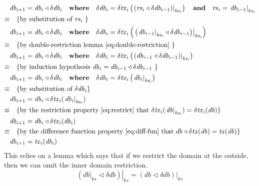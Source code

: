 \documentclass[11pt,a4paper]{article}
\newcommand\restrict[2]{\left.#1\right|_{#2}}
\begin{document}
\begin{align*}
       & \mathit{db}_{i+1} = \mathit{db}_i \triangleleft \delta\mathit{db}_i
         \quad \mathbf{where} \quad \delta\mathit{db}_i = \delta\mathit{tx}_i\left(\restrict{\left(\mathit{rs}_i \triangleleft \delta\mathit{db}_{i-1}\right)}{\mathit{ks}_i}\right)
         \quad \mathbf{and} \quad \mathit{rs}_i = \restrict{\mathit{db}_{i-1}}{\mathit{ks}_i}
      \\
\equiv & \quad \text{\{by substitution of $\mathit{rs}_i$ \}}
      \\
       & \mathit{db}_{i+1} = \mathit{db}_i \triangleleft \delta\mathit{db}_i
         \quad \mathbf{where} \quad \delta\mathit{db}_i = \delta\mathit{tx}_i\left(\restrict{\left(\restrict{\mathit{db}_{i-1}}{\mathit{ks}_i} \triangleleft \delta\mathit{db}_{i-1}\right)}{\mathit{ks}_i}\right)
      \\
\equiv & \quad \text{\{by double-restriction lemma \cref{eq:double-restriction} \}}
      \\
       & \mathit{db}_{i+1} = \mathit{db}_i \triangleleft \delta\mathit{db}_i
         \quad \mathbf{where} \quad \delta\mathit{db}_i = \delta\mathit{tx}_i\left(\restrict{\left(\mathit{db}_{i-1} \triangleleft \delta\mathit{db}_{i-1}\right)}{\mathit{ks}_i}\right)
      \\
\equiv & \quad \text{\{by induction hypothesis $\mathit{db}_i = \mathit{db}_{i-1} \triangleleft \delta\mathit{db}_{i-1}$ \}}
      \\
       & \mathit{db}_{i+1} = \mathit{db}_i \triangleleft \delta\mathit{db}_i
         \quad \mathbf{where} \quad \delta\mathit{db}_i = \delta\mathit{tx}_i\left(\restrict{\mathit{db}_i}{\mathit{ks}_i}\right)
      \\
\equiv & \quad \text{\{by substitution of $\delta\mathit{db}_i$\}}
      \\
       & \mathit{db}_{i+1} = \mathit{db}_i \triangleleft \delta\mathit{tx}_i(\restrict{\mathit{db}_i}{\mathit{ks}_i})
      \\
\equiv & \quad \text{\{by the restriction property \cref{eq:restrict} that
                     $\delta\mathit{tx}_i(\restrict{\mathit{db}}{\mathit{ks}_i}) = \delta\mathit{tx}_i(\mathit{db})$\}}
      \\
       & \mathit{db}_{i+1} = \mathit{db}_i \triangleleft \delta\mathit{tx}_i(\mathit{db}_i)
      \\
\equiv & \quad \text{\{by the difference function property \cref{eq:diff-fun} that
                     $db \triangleleft \delta\mathit{tx}(\mathit{db}) = \mathit{tx}(\mathit{db})$\}}
      \\
       & \mathit{db}_{i+1} = \mathit{tx}_i(\mathit{db}_i)
\end{align*}
This relies on a lemma which says that if we restrict the domain at the outside,
then we can omit the inner domain restriction.
\begin{equation}
\label{eq:double-restriction}
  \restrict{\left(\restrict{\mathit{db}}{\mathit{ks}} \triangleleft \delta\mathit{db}\right)}{\mathit{ks}}
=
  \restrict{\left(\mathit{db} \triangleleft \delta\mathit{db}\right)}{\mathit{ks}}
\end{equation}
\end{document}
